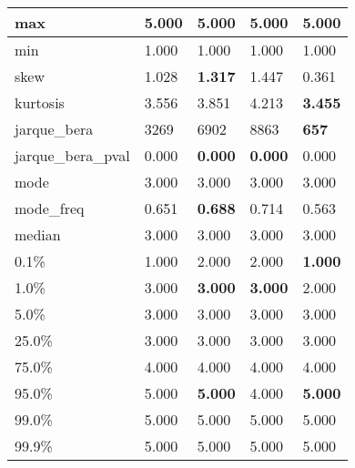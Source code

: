 \begin{table}[H]
\begin{tabular}{|l|m{10em}|m{10em}|m{10em}|m{10em}|}
\hline max & 5.000 & 5.000 & 5.000 & 5.000 \\
\hline min & 1.000 & 1.000 & 1.000 & 1.000 \\
\hline skew & 1.028 & \bfseries 1.317 & 1.447 & \cellcolor[rgb]{0.9, 0.54, 0.52} 0.361 \\
\hline kurtosis & 3.556 & 3.851 & \cellcolor[rgb]{0.9, 0.54, 0.52} 4.213 & \bfseries 3.455 \\
\hline jarque\_bera & 3269 & 6902 & \cellcolor[rgb]{0.9, 0.54, 0.52} 8863 & \bfseries 657 \\
\hline jarque\_bera\_pval & 0.000 & \bfseries 0.000 & \bfseries 0.000 & \cellcolor[rgb]{0.9, 0.54, 0.52} 0.000 \\
\hline mode & 3.000 & 3.000 & 3.000 & 3.000 \\
\hline mode\_freq & 0.651 & \bfseries 0.688 & 0.714 & \cellcolor[rgb]{0.9, 0.54, 0.52} 0.563 \\
\hline median & 3.000 & 3.000 & 3.000 & 3.000 \\
\hline 0.1\% & 1.000 & \cellcolor[rgb]{0.9, 0.54, 0.52} 2.000 & \cellcolor[rgb]{0.9, 0.54, 0.52} 2.000 & \bfseries 1.000 \\
\hline 1.0\% & 3.000 & \bfseries 3.000 & \bfseries 3.000 & \cellcolor[rgb]{0.9, 0.54, 0.52} 2.000 \\
\hline 5.0\% & 3.000 & 3.000 & 3.000 & 3.000 \\
\hline 25.0\% & 3.000 & 3.000 & 3.000 & 3.000 \\
\hline 75.0\% & 4.000 & 4.000 & 4.000 & 4.000 \\
\hline 95.0\% & 5.000 & \bfseries 5.000 & \cellcolor[rgb]{0.9, 0.54, 0.52} 4.000 & \bfseries 5.000 \\
\hline 99.0\% & 5.000 & 5.000 & 5.000 & 5.000 \\
\hline 99.9\% & 5.000 & 5.000 & 5.000 & 5.000 \\
\hline
\end{tabular}
\end{table}
